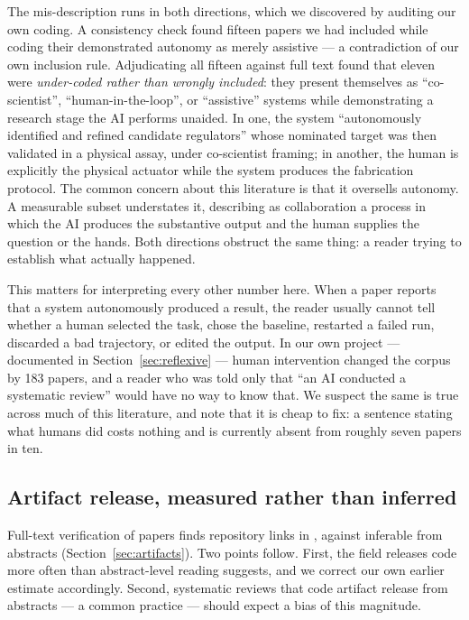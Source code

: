 The mis-description runs in both directions, which we discovered by auditing our own coding.
A consistency check found fifteen papers we had included while coding their demonstrated
autonomy as merely assistive --- a contradiction of our own inclusion rule. Adjudicating all
fifteen against full text found that eleven were \emph{under-coded rather than wrongly
included}: they present themselves as ``co-scientist'', ``human-in-the-loop'', or ``assistive''
systems while demonstrating a research stage the AI performs unaided. In one, the system
``autonomously identified and refined candidate regulators'' whose nominated target was then
validated in a physical assay, under co-scientist framing; in another, the human is explicitly
the physical actuator while the system produces the fabrication protocol. The common concern
about this literature is that it oversells autonomy. A measurable subset understates it,
describing as collaboration a process in which the AI produces the substantive output and the
human supplies the question or the hands. Both directions obstruct the same thing: a reader
trying to establish what actually happened.

This matters for interpreting every other number here. When a paper reports that a system
autonomously produced a result, the reader usually cannot tell whether a human selected the
task, chose the baseline, restarted a failed run, discarded a bad trajectory, or edited the
output. In our own project --- documented in Section~\ref{sec:reflexive} --- human
intervention changed the corpus by 183 papers, and a reader who was told only that ``an AI
conducted a systematic review'' would have no way to know that. We suspect the same is true
across much of this literature, and note that it is cheap to fix: a sentence stating what
humans did costs nothing and is currently absent from roughly seven papers in ten.

\subsection{Artifact release, measured rather than inferred}

Full-text verification of \nArtChecked{} papers finds repository links in \pctRepo{}, against
\pctRepoAbstract{} inferable from abstracts (Section~\ref{sec:artifacts}). Two points follow.
First, the field releases code more often than abstract-level reading suggests, and we correct
our own earlier estimate accordingly. Second, systematic reviews that code artifact release
from abstracts --- a common practice --- should expect a bias of this magnitude.
